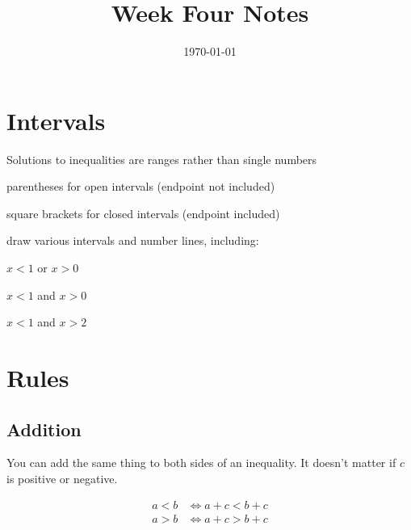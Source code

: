 \documentclass[letterpaper, landscape]{exam}
\title{Week Four Notes}
\author{}
\date{\today}
\begin{document}
  \maketitle

  \tableofcontents

  \section{Intervals}

  Solutions to inequalities are ranges rather than single numbers
  \begin{itemize*}
    \item parentheses for open intervals (endpoint not included)
    \item square brackets for closed intervals (endpoint included)
    \item draw various intervals and number lines, including:
      \begin{itemize*}
        \item $x < 1$ or $x > 0$
        \item $x < 1$ and $x > 0$
        \item $x < 1$ and $x > 2$
      \end{itemize*}
  \end{itemize*}

  \section{Rules} %
  
  \subsection{Addition} %

  You can add the same thing to both sides of an inequality. It doesn't matter if $c$ is positive or
  negative.

  \begin{align*}
    a < b & \iff a + c < b + c \\
    a > b & \iff a + c > b + c \\
  \end{align*}
    
\end{document}

